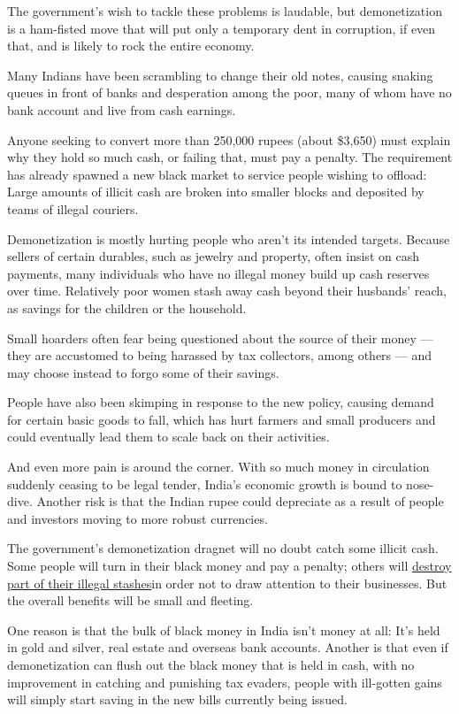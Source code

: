 The government's wish to tackle these problems is laudable, but
demonetization is a ham-fisted move that will put only a temporary dent
in corruption, if even that, and is likely to rock the entire economy.

Many Indians have been scrambling to change their old notes, causing
snaking queues in front of banks and desperation among the poor, many of
whom have no bank account and live from cash earnings.

Anyone seeking to convert more than 250,000 rupees (about \$3,650) must
explain why they hold so much cash, or failing that, must pay a penalty.
The requirement has already spawned a new black market to service people
wishing to offload: Large amounts of illicit cash are broken into
smaller blocks and deposited by teams of illegal couriers.

Demonetization is mostly hurting people who aren't its intended targets.
Because sellers of certain durables, such as jewelry and property, often
insist on cash payments, many individuals who have no illegal money
build up cash reserves over time. Relatively poor women stash away cash
beyond their husbands' reach, as savings for the children or the
household.

Small hoarders often fear being questioned about the source of their
money --- they are accustomed to being harassed by tax collectors, among
others --- and may choose instead to forgo some of their savings.

People have also been skimping in response to the new policy, causing
demand for certain basic goods to fall, which has hurt farmers and small
producers and could eventually lead them to scale back on their
activities.

And even more pain is around the corner. With so much money in
circulation suddenly ceasing to be legal tender, India's economic growth
is bound to nose-dive. Another risk is that the Indian rupee could
depreciate as a result of people and investors moving to more robust
currencies.

The government's demonetization dragnet will no doubt catch some illicit
cash. Some people will turn in their black money and pay a penalty;
others will
\href{http://www.ndtv.com/india-news/sacks-full-of-burnt-500-and-1-000-rupee-notes-in-uttar-pradesh-1623440}{destroy
part of their illegal stashes}in order not to draw attention to their
businesses. But the overall benefits will be small and fleeting.

One reason is that the bulk of black money in India isn't money at all:
It's held in gold and silver, real estate and overseas bank accounts.
Another is that even if demonetization can flush out the black money
that is held in cash, with no improvement in catching and punishing tax
evaders, people with ill-gotten gains will simply start saving in the
new bills currently being issued.

